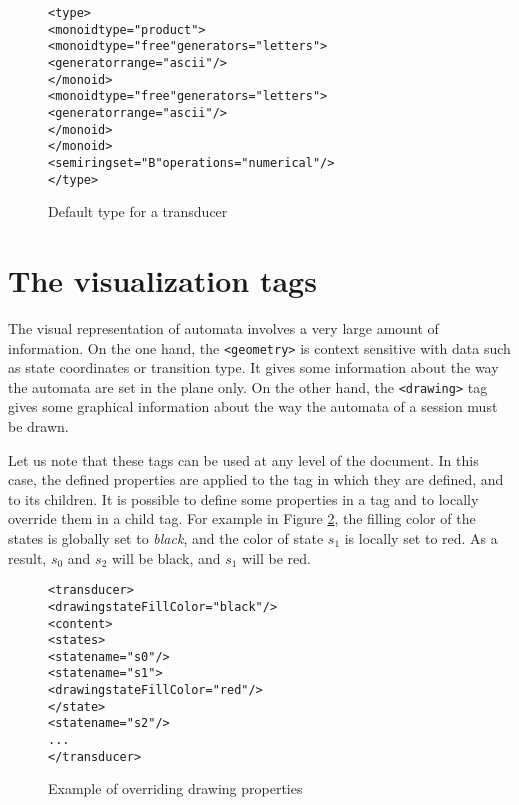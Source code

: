 \documentclass[a4paper]{article}
\def\geometrytag{\texttt{<geometry>}}
\def\drawingtag{\texttt{<drawing>}}
\begin{document}
\begin{figure}[h]
  \begin{center}
\begin{alltt}
<type>
  <monoid type="product">
     <monoid type="free" generators="letters">
       <generator range="ascii"/>
     </monoid>
     <monoid type="free" generators="letters">
       <generator range="ascii"/>
     </monoid>
  </monoid>
  <semiring set="B" operations="numerical"/>
</type>
\end{alltt}

\caption{Default type for a transducer}
\label{transducertype}
  \end{center}
\end{figure}

\newpage
\section{The visualization tags}
\label{title_vizualisation}
The visual representation of automata involves a very large amount of
information. On the one hand, the \geometrytag{} is context sensitive
with data such as state coordinates or transition type. It gives some
information about the way the automata are set in the plane only.  On
the other hand, the \drawingtag{} tag gives some graphical information
about the way the automata of a session must be drawn.

Let us note that these tags can be used at any level of the document. In this
case, the defined properties are applied to the tag in which they are defined,
and to its children. It is possible to define some properties in a tag and to
locally override them in a child tag. For example in Figure
\ref{override_properties}, the filling color of the states is globally set to
\textit{black}, and the color of state $s_1$ is locally set to red. As a
result, $s_0$ and $s_2$ will be black, and $s_1$ will be red.

{\small
\begin{figure}[h]
  \begin{center}
\begin{alltt}
<transducer>
  <drawing stateFillColor="black"/>
  <content>
     <states>
        <state name="s0"/>
        <state name="s1">
            <drawing stateFillColor="red"/>
        </state>
        <state name="s2"/>
      ...
</transducer>
\end{alltt}

\caption{Example of overriding drawing properties}
\label{override_properties}
  \end{center}
\end{figure}
}
\end{document}
